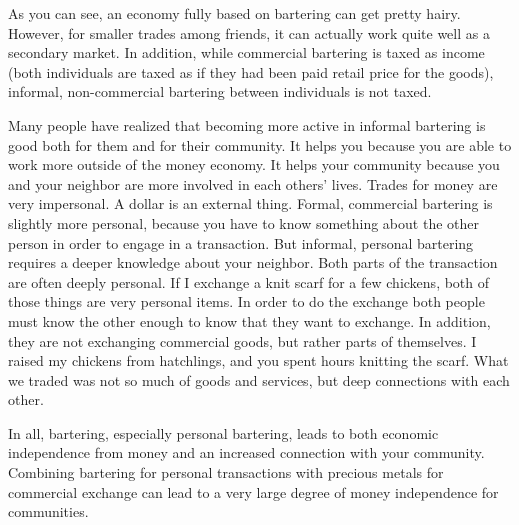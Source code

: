 As you can see, an economy fully based on bartering can get pretty hairy.  However,
for smaller trades among friends, it can actually work quite well as a secondary
market.  In addition, while commercial bartering is taxed as income (both individuals
are taxed as if they had been paid retail price for the goods), informal, non-commercial
bartering between individuals is not taxed.

Many people have realized that becoming more active in informal bartering is good both
for them and for their community.  It helps you because you are able to work more outside
of the money economy.  It helps your community because you and your neighbor are more
involved in each others' lives.  Trades for money are very impersonal.  A dollar is
an external thing.  Formal, commercial bartering is slightly more personal, because
you have to know something about the other person in order to engage in a transaction.
But informal, personal bartering requires a deeper knowledge about your neighbor.
Both parts of the transaction are often deeply personal.  If I exchange a knit scarf
for a few chickens, both of those things are very personal items.  In order to do
the exchange both people must know the other enough to know that they want to exchange.
In addition, they are not exchanging commercial goods, but rather parts of themselves.
I raised my chickens from hatchlings, and you spent hours knitting the scarf.  What
we traded was not so much of goods and services, but deep connections with each other.

In all, bartering, especially personal bartering, leads to both economic independence
from money and an increased connection with your community.  Combining bartering
for personal transactions with precious metals for commercial exchange can lead to a 
very large degree of money independence for communities.

